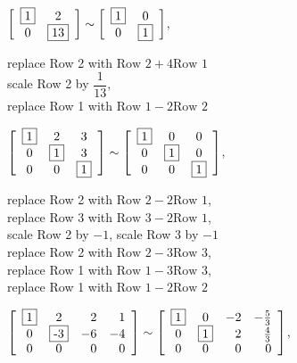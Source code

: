 
\begin{enumerate}[!HW!, start=1]%
\begin{multicols}{2} %
\item $\mtx{cc}{\fbox{1}&2\\0&\fbox{13}}\sim\mtx{cc}{\fbox{1}&0\\0&\fbox{1}}$, \columnbreak 

replace Row 2 with $\text{Row 2} +4\text{Row 1}$ \\ scale Row 2 by $\dfrac{1}{13}$,\\ replace Row 1 with $\text{Row 1} -2\text{Row 2}$
\end{multicols}

\begin{multicols}{2}
\itemspade $\mtx{ccc}{\fbox{1}&2&3\\0&\fbox{1}&3\\0&0&\fbox{1}} \sim\mtx{ccc}{\fbox{1}&0&0\\0&\fbox{1}&0\\0&0&\fbox{1}}$,\columnbreak 

replace Row 2 with $\text{Row 2} - 2\text{Row 1}$,\\ replace Row 3 with $\text{Row 3} - 2\text{Row 1}$,\\  scale Row 2 by $-1$, scale Row 3 by $-1$ \\ replace Row 2 with $\text{Row 2} - 3\text{Row 3}$,\\ replace Row 1 with $\text{Row 1} - 3\text{Row 3}$,\\ replace Row 1 with $\text{Row 1} - 2\text{Row 2}$ 
\end{multicols}
\begin{multicols}{2}
\itemspade $\mtx{ccrr}{\fbox{1}&2&2&1\\0&\fbox{-3}&-6&-4\\0&0&0&0}\sim\mtx{ccrr}{\fbox{1}&0&-2&-\frac{5}{3}\\0&\fbox{1}&2&\frac{4}{3}\\0&0&0&0}$,\columnbreak 


\end{multicols}
\end{enumerate}
